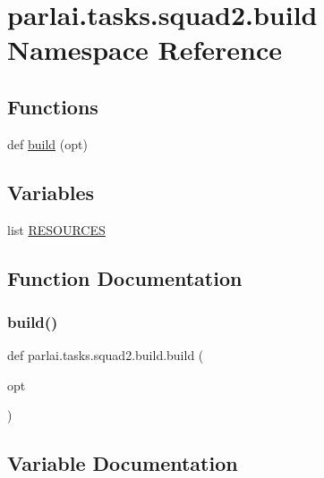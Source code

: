 \hypertarget{namespaceparlai_1_1tasks_1_1squad2_1_1build}{}\section{parlai.\+tasks.\+squad2.\+build Namespace Reference}
\label{namespaceparlai_1_1tasks_1_1squad2_1_1build}
\subsection*{Functions}
\begin{DoxyCompactItemize}
\item 
def \hyperlink{namespaceparlai_1_1tasks_1_1squad2_1_1build_ac3bace71a0761323718dcde114b169d7}{build} (opt)
\end{DoxyCompactItemize}
\subsection*{Variables}
\begin{DoxyCompactItemize}
\item 
list \hyperlink{namespaceparlai_1_1tasks_1_1squad2_1_1build_a57d77d08dab79a5fdf893c84ffa5b487}{R\+E\+S\+O\+U\+R\+C\+ES}
\end{DoxyCompactItemize}


\subsection{Function Documentation}
\mbox{\label{namespaceparlai_1_1tasks_1_1squad2_1_1build_ac3bace71a0761323718dcde114b169d7}} 
\subsubsection{\texorpdfstring{build()}{build()}}
{\footnotesize\ttfamily def parlai.\+tasks.\+squad2.\+build.\+build (\begin{DoxyParamCaption}\item[{}]{opt }\end{DoxyParamCaption})}



\subsection{Variable Documentation}
\mbox{\label{namespaceparlai_1_1tasks_1_1squad2_1_1build_a57d77d08dab79a5fdf893c84ffa5b487}} 
